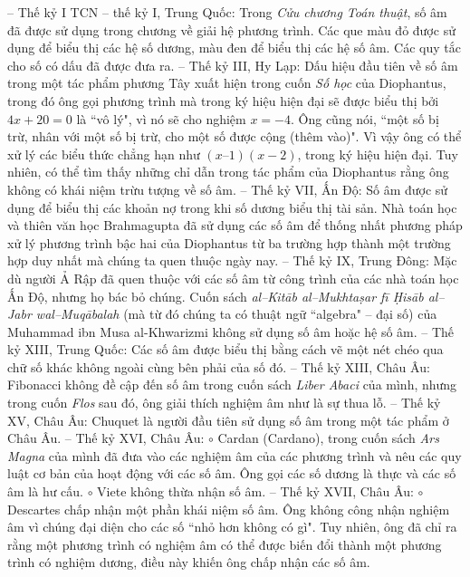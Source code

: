 \begin{multicols}{2}
	\vskip 0.1cm
	-- Thế kỷ I TCN -- thế kỷ I, Trung Quốc: Trong \textit{Cửu chương Toán thuật}, số âm đã được sử dụng trong chương về giải hệ phương trình. Các que màu đỏ được sử dụng để biểu thị các hệ số dương, màu đen để biểu thị các hệ số âm. Các quy tắc cho số có dấu đã được đưa ra.
	\vskip 0.1cm
	-- Thế kỷ III, Hy Lạp: Dấu hiệu đầu tiên về số âm trong một tác phẩm phương Tây xuất hiện trong cuốn \textit{Số học} của Diophantus, trong đó ông gọi phương trình mà trong ký hiệu hiện đại sẽ được biểu thị bởi $4x + 20 = 0$ là ``vô lý", vì nó sẽ cho nghiệm $x=-4$. Ông cũng nói, ``một số bị trừ, nhân với một số bị trừ, cho một số được cộng (thêm vào)". Vì vậy ông có thể xử lý các biểu thức chẳng hạn như $(x–1)(x-2)$, trong ký hiệu hiện đại. Tuy nhiên, có thể tìm thấy những chỉ dẫn trong tác phẩm của Diophantus rằng ông không có khái niệm trừu tượng về số âm.
	\vskip 0.1cm
	-- Thế kỷ VII, Ấn Độ: Số âm được sử dụng để biểu thị các khoản nợ trong khi số dương biểu thị tài sản. Nhà toán học và thiên văn học Brahmagupta đã sử dụng các số âm để thống nhất phương pháp xử lý phương trình bậc hai của Diophantus từ ba trường hợp thành một trường hợp duy nhất mà chúng ta quen thuộc ngày nay.
	\vskip 0.1cm
	-- Thế kỷ IX, Trung Đông: Mặc dù người Ả Rập đã quen thuộc với các số âm từ công trình của các nhà toán học Ấn Độ, nhưng họ bác bỏ chúng. Cuốn sách \textit{al--Kitāb al--Mukhtaṣar fī Ḥisāb al--Jabr wal--Muqābalah} (mà từ đó chúng ta có thuật ngữ ``algebra" -- đại số) của Muhammad ibn Musa al-Khwarizmi không sử dụng số âm hoặc hệ số âm.
	\vskip 0.1cm
	-- Thế kỷ XIII, Trung Quốc: Các số âm được biểu thị bằng cách vẽ một nét chéo qua chữ số khác không ngoài cùng bên phải của số đó.
	\vskip 0.1cm
	-- Thế kỷ XIII, Châu Âu: Fibonacci không đề cập đến số âm trong cuốn sách \textit{Liber Abaci} của mình, nhưng trong cuốn \textit{Flos} sau đó, ông giải thích nghiệm âm như là sự thua lỗ.
	\vskip 0.1cm
	-- Thế kỷ XV, Châu Âu: Chuquet là người đầu tiên sử dụng số âm trong một tác phẩm ở Châu Âu.
	\vskip 0.1cm
	-- Thế kỷ XVI, Châu Âu: 
	\vskip 0.1cm
	$\circ$ Cardan (Cardano), trong cuốn sách \textit{Ars Magna} của mình đã đưa vào các nghiệm âm của các phương trình và nêu các quy luật cơ bản của hoạt động với các số âm. Ông gọi các số dương là thực và các số âm là hư cấu.
	\vskip 0.1cm
	$\circ$ Viete không thừa nhận số âm.
	\vskip 0.1cm
	-- Thế kỷ XVII, Châu Âu:
	\vskip 0.1cm
	$\circ$ Descartes chấp nhận một phần khái niệm số âm. Ông không công nhận nghiệm âm vì chúng đại diện cho các số ``nhỏ hơn không có gì". Tuy nhiên, ông đã chỉ ra rằng một phương trình có nghiệm âm có thể được biến đổi thành một phương trình có nghiệm dương, điều này khiến ông chấp nhận các số âm.

\end{multicols}
